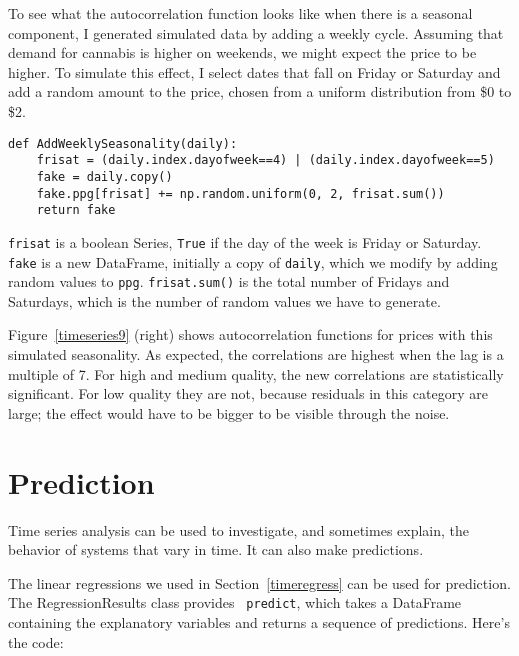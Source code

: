 To see what the autocorrelation function looks like when there is a
seasonal component, I generated simulated data by adding a weekly
cycle.  Assuming that demand for cannabis is higher on weekends, we
might expect the price to be higher.  To simulate this effect, I
select dates that fall on Friday or Saturday and add a random amount
to the price, chosen from a uniform distribution from \$0 to \$2.

\begin{verbatim}
def AddWeeklySeasonality(daily):
    frisat = (daily.index.dayofweek==4) | (daily.index.dayofweek==5)
    fake = daily.copy()
    fake.ppg[frisat] += np.random.uniform(0, 2, frisat.sum())
    return fake
\end{verbatim}

{\tt frisat} is a boolean Series, {\tt True} if the day of the
week is Friday or Saturday.  {\tt fake} is a new DataFrame, initially
a copy of {\tt daily}, which we modify by adding random values
to {\tt ppg}.  {\tt frisat.sum()} is the total number of Fridays
and Saturdays, which is the number of random values we have to
generate.

Figure~\ref{timeseries9} (right) shows autocorrelation functions for
prices with this simulated seasonality.  As expected, the
correlations are highest when the lag is a multiple of 7.  For
high and medium quality, the new correlations are statistically
significant.  For low quality they are not, because residuals in this
category are large; the effect would have to be bigger
to be visible through the noise.
   


\section{Prediction}  

Time series analysis can be used to investigate, and sometimes
explain, the behavior of systems that vary in time.  It can also
make predictions.

The linear regressions we used in Section~\ref{timeregress} can be
used for prediction.  The RegressionResults class provides {\tt
  predict}, which takes a DataFrame containing the explanatory
variables and returns a sequence of predictions.  Here's the code:

